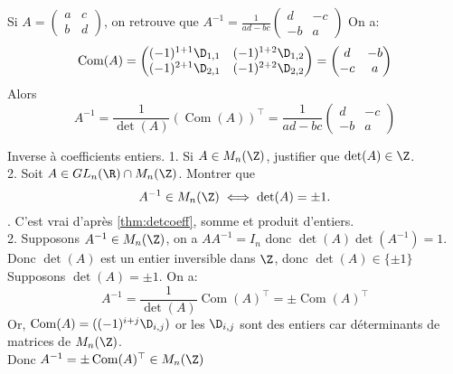 \documentclass[11pt]{article}
\DeclareMathOperator*{\Com}{Com}
\begin{document}
\begin{ex}{}{}
    Si $A=\begin{pmatrix}
        a&c\\
        b&d
    \end{pmatrix}$, on retrouve que $A^{-1}=\frac{1}{ad-bc}\begin{pmatrix}
        d&-c\\
        -b&a
    \end{pmatrix}$
    \tcblower
    On a:
    \begin{equation*}
        \Com(A)=\begin{pmatrix}
            (-1)^{1+1}\D_{1,1}&(-1)^{1+2}\D_{1,2}\\
            (-1)^{2+1}\D_{2,1}&(-1)^{2+2}\D_{2,2}
        \end{pmatrix}=\begin{pmatrix}
            d&-b\\
            -c&a
        \end{pmatrix}
    \end{equation*}
    Alors
    \begin{equation*}
        A^{-1}=\frac{1}{\det(A)}(\Com(A))^\top=\frac{1}{ad-bc}\begin{pmatrix}
            d&-c\\
            -b&a
        \end{pmatrix}
    \end{equation*}
\end{ex}

\begin{ex}{Inverse à coefficients entiers.}{}
    1. Si $A\in M_n(\Z)$, justifier que $\det(A)\in\Z$.\\
    2. Soit $A\in GL_n(\R)\cap M_n(\Z)$. Montrer que 
    \begin{equation*}
        A^{-1}\in M_n(\Z)\iff \det(A)=\pm1.
    \end{equation*}
    . C'est vrai d'après \ref{thm:detcoeff}, somme et produit d'entiers.\\
    2. \fbox{$\ra$} Supposons $A^{-1}\in M_n(\Z)$, on a $AA^{-1}=I_n$ donc $\det(A)\det(A^{-1})=1$.\\
    Donc $\det(A)$ est un entier inversible dans $\Z$, donc $\det(A)\in\{\pm1\}$\n
    \fbox{$\la$} Supposons $\det(A)=\pm1$. On a:
    \begin{equation*}
        A^{-1}=\frac{1}{\det(A)}\Com(A)^\top=\pm\Com(A)^\top
    \end{equation*}
    Or, $\Com(A)=((-1)^{i+j}\D_{i,j})$ or les $\D_{i,j}$ sont des entiers car déterminants de matrices de $M_n(\Z)$.\\
    Donc $A^{-1}=\pm\Com(A)^\top\in M_n(\Z)$
\end{ex}
\end{document}
